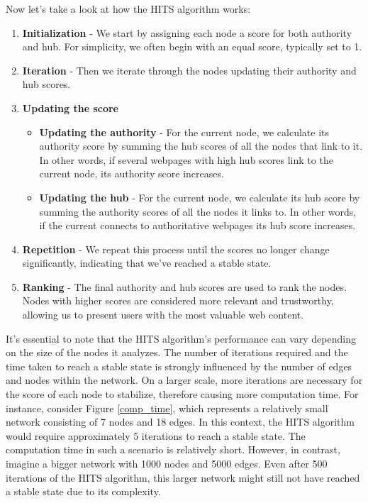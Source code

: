 \documentclass[10pt,english,a4paper]{article}
\begin{document}
\\\\\\\\
\\Now let's take a look at how the HITS algorithm works:
\begin{enumerate}
  \item \textbf{Initialization} - We start by assigning each node a score for both authority and hub. For simplicity, we often begin with an equal score, typically set to 1.
  \item \textbf{Iteration} - Then we iterate through the nodes updating their authority and hub scores.
  \item \textbf{Updating the score}
  \begin{itemize}
    \item \textbf{Updating the authority} - For the current node, we calculate its authority score by summing the hub scores of all the nodes that link to it. In other words, if several webpages with high hub scores link to the current node, its authority score increases.
    \item \textbf{Updating the hub} - For the current node, we calculate its hub score by summing the authority scores of all the nodes it links to. In other words, if the current connects to authoritative webpages its hub score increases.
  \end{itemize}
  \item \textbf{Repetition} - We repeat this process until the scores no longer change significantly, indicating that we've reached a stable state.
  \item \textbf{Ranking} - The final authority and hub scores are used to rank the nodes. Nodes with higher scores are considered more relevant and trustworthy, allowing us to present users with the most valuable web content.
\end{enumerate} 
It's essential to note that the HITS algorithm's performance can vary depending on the size of the nodes it analyzes. The number of iterations required and the time taken to reach a stable state is strongly influenced by the number of edges and nodes within the network. On a larger scale, more iterations are necessary for the score of each node to stabilize, therefore causing more computation time. 
For instance, consider Figure \ref{comp_time}, which represents a relatively small network consisting of 7 nodes and 18 edges. In this context, the HITS algorithm would require approximately 5 iterations to reach a stable state. The computation time in such a scenario is relatively short. However, in contrast, imagine a bigger network with 1000 nodes and 5000 edges. Even after 500 iterations of the HITS algorithm, this larger network might still not have reached a stable state due to its complexity.
\end{document}

